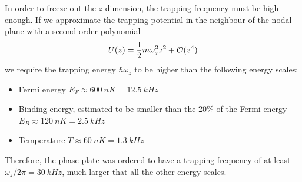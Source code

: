 In order to freeze-out the $z$ dimension, the trapping frequency must be high enough. If we approximate the trapping potential in the neighbour of the nodal plane with a second order polynomial
\begin{equation}
    U(z) = \frac{1}{2} m \omega_z^2 z^2 + \mathcal{O}(z^4)
\end{equation}
we require the trapping energy $\hbar \omega_z$ to be higher than the following energy scales:
\begin{itemize}
    \item Fermi energy $E_F \approx \SI{600}{nK} = \SI{12.5}{kHz}$
    \item Binding energy, estimated to be smaller than the 20\% of the Fermi energy $E_B \approx \SI{120}{nK} = \SI{2.5}{kHz}$
    \item Temperature $T \approx \SI{60}{nK} = \SI{1.3}{kHz}$
\end{itemize}
Therefore, the phase plate was ordered to have a trapping frequency of at least $\omega_z / 2\pi = \SI{30}{kHz}$, much larger that all the other energy scales.

